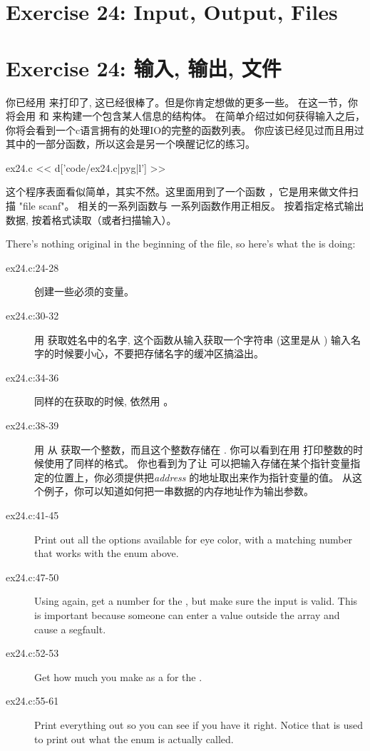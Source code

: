 \chapter{Exercise 24: Input, Output, Files}
\chapter{Exercise 24: 输入, 输出, 文件}

你已经用  来打印了, 这已经很棒了。但是你肯定想做的更多一些。 
在这一节，你将会用  和  来构建一个包含某人信息的结构体。
在简单介绍过如何获得输入之后，你将会看到一个c语言拥有的处理IO的完整的函数列表。
你应该已经见过而且用过其中的一部分函数，所以这会是另一个唤醒记忆的练习。

\begin{code}{ex24.c}
<< d['code/ex24.c|pyg|l'] >>
\end{code}

这个程序表面看似简单，其实不然。这里面用到了一个函数 ，它是用来做文件扫描 "file scanf"。
  相关的一系列函数与  一系列函数作用正相反。 
  按着指定格式输出数据,  按着格式读取（或者扫描输入）。

There's nothing original in the beginning of the file, so here's what
the  is doing:

\begin{description}
\item[ex24.c:24-28] 创建一些必须的变量。
\item[ex24.c:30-32] 用 获取姓名中的名字, 这个函数从输入获取一个字符串
    (这里是从 ) 输入名字的时候要小心，不要把存储名字的缓冲区搞溢出。
\item[ex24.c:34-36] 同样的在获取的时候, 依然用 。
\item[ex24.c:38-39] 用 从 获取一个整数，而且这个整数存储在
    .  你可以看到在用 打印整数的时候使用了同样的格式。
    你也看到为了让  可以把输入存储在某个指针变量指定的位置上，你必须提供把\emph{address} 的地址取出来作为指针变量的值。 从这个例子，你可以知道如何把一串数据的内存地址作为输出参数。
\item[ex24.c:41-45] Print out all the options available for eye color, with a matching
    number that works with the  enum above.
\item[ex24.c:47-50] Using  again, get a number for the , 
    but make sure the input is valid.  This is important because someone can
    enter a value outside the  array and cause a 
    segfault.
\item[ex24.c:52-53] Get how much you make as a  for the .
\item[ex24.c:55-61] Print everything out so you can see if you have it right.  Notice
    that  is used to print out what the 
    enum is actually called.
\end{description}


